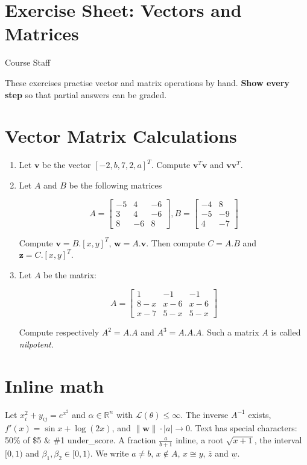 \section{Exercise Sheet: Vectors and Matrices}

Course Staff

These exercises practise vector and matrix operations by hand. \textbf{Show every step} so that partial answers can be graded.

\section{Vector Matrix Calculations}

\begin{enumerate}
\item Let \(\mathbf{v}\) be the vector \([-2, b, 7, 2, a]^T\). Compute \(\mathbf{v}^T\mathbf{v}\) and \(\mathbf{v}\mathbf{v}^T\).
\item Let \(A\) and \(B\) be the following matrices

\[
A = \begin{bmatrix}
-5 & 4 & -6 \\
3 & 4 & -6 \\
8 & -6 & 8
\end{bmatrix}, B = \begin{bmatrix}
-4 & 8 \\
-5 & -9 \\
4 & -7
\end{bmatrix}
\]

Compute \(\mathbf{v} = B.[x, y]^T\), \(\mathbf{w} = A.\mathbf{v}\). Then compute \(C = A.B\) and \(\mathbf{z} = C.[x, y]^T\).
\item Let \(A\) be the matrix:

\[
A = \begin{bmatrix}
1 & -1 & -1 \\
8 - x & x - 6 & x - 6 \\
x - 7 & 5 - x & 5 - x
\end{bmatrix}
\]

Compute respectively \(A^2 = A.A\) and \(A^3 = A.A.A\). Such a matrix \(A\) is called \emph{nilpotent}.
\end{enumerate}

\section{Inline math}

Let \(x_i^2 + y_{ij} = e^{x^2}\) and \(\alpha \in \mathbb{R}^n\) with \(\mathcal{L}(\theta) \leq \infty\). The inverse \(A^{-1}\) exists, \(f'(x) = \sin x + \log(2x)\), and \(\|\mathbf{w}\| \cdot |a| \to 0\). Text has special characters: 50\% of \$5 \& \#1 under\_score. A fraction \(\frac{a}{b + 1}\) inline, a root \(\sqrt{x + 1}\), the interval \([0, 1)\) and \(\beta_1, \beta_2 \in [0, 1)\). We write \(a \neq b\), \(x \notin A\), \(x \cong y\), \(\overline{z}\) and \(\underline{w}\).

